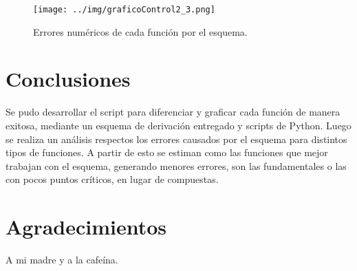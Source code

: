 \documentclass[../portafolio.tex]{subfiles}
\begin{document}
\begin{figure}
\centering
\texttt{[image: ../img/graficoControl2\_3.png]} 
\caption{Errores numéricos de cada función por el esquema.}\label{g0_c2:fig:control_23}
\end{figure}


\section*{Conclusiones}
Se pudo desarrollar el script para diferenciar y graficar cada función de manera exitosa, mediante un esquema de derivación entregado y scripts de Python. Luego se realiza un análisis respectos  los errores causados por el esquema para distintos tipos de funciones. A partir de esto se estiman  como las funciones que mejor trabajan con el esquema, generando menores errores, son las fundamentales o las con pocos puntos críticos, en lugar de compuestas. 
\section*{Agradecimientos}
A mi madre y a la cafeína.
\end{document}
